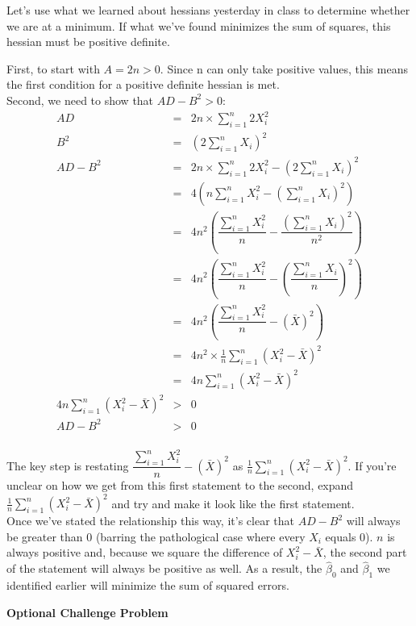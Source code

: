 \documentclass[10pt]{amsart}
\begin{document}
Let's use what we learned about hessians yesterday in class to determine whether we are at a minimum. If what we've found minimizes the sum of squares, this hessian must be positive definite.

First, to start with $A=2n > 0$. Since n can only take positive values, this means the first condition for a positive definite hessian is met.\\

Second, we need to show that $AD - B^2 > 0$:
\begin{eqnarray*}
AD &=& 2n\times \sum_{i=1}^n 2X_i^2\\
B^2 &=&  (2 \sum_{i=1}^nX_i)^2\\
AD - B^2 &=& 2n \times \sum_{i=1}^n 2X_i^2 - (2 \sum_{i=1}^nX_i)^2\\
&=& 4( n\sum_{i=1}^n X_i^2 - (\sum_{i=1}^{n} X_i)^2)\\
&=& 4n^2( \dfrac{\sum_{i=1}^n X_i^2}{n} - \dfrac{(\sum_{i=1}^n X_i)^2}{n^2})\\
&=& 4n^2( \dfrac{\sum_{i=1}^n X_i^2}{n} - (\dfrac{\sum_{i=1}^n X_i}{n})^2)\\
&=& 4n^2( \dfrac{\sum_{i=1}^n X_i^2}{n} - (\bar{X})^2)\\
&=& 4n^2 \times \frac{1}{n} \sum_{i=1}^n (X_i^2 - \bar{X})^2\\
&=& 4n \sum_{i=1}^n (X_i^2 - \bar{X})^2\\
4n \sum_{i=1}^n (X_i^2 - \bar{X})^2 &>& 0\\
AD - B^2 &>& 0\\
\end{eqnarray*}

The key step is restating $\dfrac{\sum_{i=1}^n X_i^2}{n} - (\bar{X})^2$ as $\frac{1}{n}\sum_{i=1}^n (X_i^2 - \bar{X})^2$. If you're unclear on how we get from this first statement to the second, expand $\frac{1}{n}\sum_{i=1}^n (X_i^2 - \bar{X})^2$ and try and make it look like the first statement. \\ 

Once we've stated the relationship this way, it's clear that $AD - B^2$ will always be greater than 0 (barring the pathological case where every $X_i$ equals 0). $n$ is always positive and, because we square the difference of $X_i^2 - \bar{X}$, the second part of the statement will always be positive as well. As a result, the $\hat \beta_0$ and $\hat \beta_1$ we identified earlier will minimize the sum of squared errors. 


\textbf{Optional Challenge Problem}\\
\end{document}
